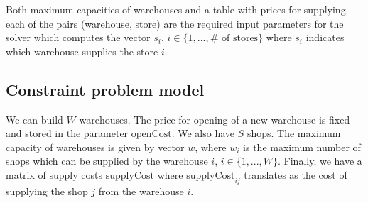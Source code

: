 Both maximum capacities of warehouses and a table with
prices for supplying each of the pairs (warehouse, store) are the required input parameters for the solver which computes the vector
 $s_i$, $i \in \{1,...,\#\text{ of stores}\}$ where $s_i$ indicates which warehouse
 supplies the store $i$.

\subsection{Constraint problem model}
We can build $W$ warehouses. The price for opening of a new warehouse is fixed and 
stored in the parameter $\mathrm{openCost}$. We also have $S$ shops. The maximum capacity
of warehouses is given by vector $w$, where $w_i$ is the maximum number of shops which
can be supplied by the warehouse $i$, $i \in \{1,...,W\}$.
Finally, we have a matrix of supply costs $\mathrm{supplyCost}$ where $\mathrm{supplyCost}_{ij}$ 
translates as the cost of supplying the shop $j$ from the warehouse $i$.

